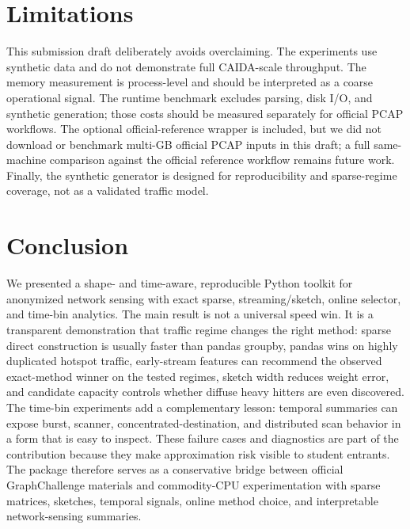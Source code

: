 \documentclass[conference]{IEEEtran}
\begin{document}
\section{Limitations}
This submission draft deliberately avoids overclaiming. The experiments use synthetic data and do not demonstrate full CAIDA-scale throughput. The memory measurement is process-level and should be interpreted as a coarse operational signal. The runtime benchmark excludes parsing, disk I/O, and synthetic generation; those costs should be measured separately for official PCAP workflows. The optional official-reference wrapper is included, but we did not download or benchmark multi-GB official PCAP inputs in this draft; a full same-machine comparison against the official reference workflow remains future work. Finally, the synthetic generator is designed for reproducibility and sparse-regime coverage, not as a validated traffic model.

\section{Conclusion}
We presented a shape- and time-aware, reproducible Python toolkit for anonymized network sensing with exact sparse, streaming/sketch, online selector, and time-bin analytics. The main result is not a universal speed win. It is a transparent demonstration that traffic regime changes the right method: sparse direct construction is usually faster than pandas groupby, pandas wins on highly duplicated hotspot traffic, early-stream features can recommend the observed exact-method winner on the tested regimes, sketch width reduces weight error, and candidate capacity controls whether diffuse heavy hitters are even discovered. The time-bin experiments add a complementary lesson: temporal summaries can expose burst, scanner, concentrated-destination, and distributed scan behavior in a form that is easy to inspect. These failure cases and diagnostics are part of the contribution because they make approximation risk visible to student entrants. The package therefore serves as a conservative bridge between official GraphChallenge materials and commodity-CPU experimentation with sparse matrices, sketches, temporal signals, online method choice, and interpretable network-sensing summaries.



\end{document}
